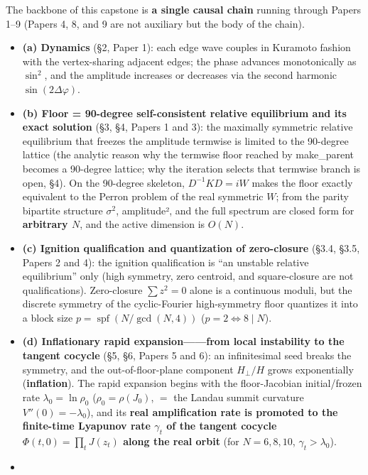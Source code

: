 \documentclass[
  a4paper,
]{ltjsarticle}
\providecommand{\tightlist}{%
  \setlength{\itemsep}{0pt}\setlength{\parskip}{0pt}}
\begin{document}
The backbone of this capstone is \textbf{a single causal chain} running
through Papers 1--9 (Papers 4, 8, and 9 are not auxiliary but the body
of the chain).

\begin{itemize}
\tightlist
\item
  \textbf{(a) Dynamics} (§2, Paper 1): each edge wave couples in
  Kuramoto fashion with the vertex-sharing adjacent edges; the phase
  advances monotonically as \(\sin^2\), and the amplitude increases or
  decreases via the second harmonic \(\sin(2\Delta\varphi)\).
\item
  \textbf{(b) Floor = 90-degree self-consistent relative equilibrium and
  its exact solution} (§3, §4, Papers 1 and 3): the maximally symmetric
  relative equilibrium that freezes the amplitude termwise is limited to
  the 90-degree lattice (the analytic reason why the termwise floor
  reached by make\_parent becomes a 90-degree lattice; why the iteration
  selects that termwise branch is open, §4). On the 90-degree skeleton,
  \(D^{-1}KD=iW\) makes the floor exactly equivalent to the Perron
  problem of the real symmetric \(W\); from the parity bipartite
  structure \(\sigma^2\), amplitude², and the full spectrum are closed
  form for \textbf{arbitrary \(N\)}, and the active dimension is
  \(O(N)\).
\item
  \textbf{(c) Ignition qualification and quantization of zero-closure}
  (§3.4, §3.5, Papers 2 and 4): the ignition qualification is ``an
  unstable relative equilibrium'' only (high symmetry, zero centroid,
  and square-closure are not qualifications). Zero-closure
  \(\sum z^2=0\) alone is a continuous moduli, but the discrete symmetry
  of the cyclic-Fourier high-symmetry floor quantizes it into a block
  size \(p=\operatorname{spf}(N/\gcd(N,4))\) (\(p=2\iff 8\mid N\)).
\item
  \textbf{(d) Inflationary rapid expansion------from local instability
  to the tangent cocycle} (§5, §6, Papers 5 and 6): an infinitesimal
  seed breaks the symmetry, and the out-of-floor-plane component
  \(H_\perp/H\) grows exponentially (\textbf{inflation}). The rapid
  expansion begins with the floor-Jacobian initial/frozen rate
  \(\lambda_0=\ln\rho_0\) (\(\rho_0=\rho(J_0)\), \(=\) the Landau summit
  curvature \(V''(0)=-\lambda_0\)), and its \textbf{real amplification
  rate is promoted to the finite-time Lyapunov rate \(\gamma_t\) of the
  tangent cocycle \(\Phi(t,0)=\prod_t J(z_t)\) along the real orbit}
  (for \(N=6,8,10\), \(\gamma_t>\lambda_0\)).
\item

\end{itemize}
\end{document}
